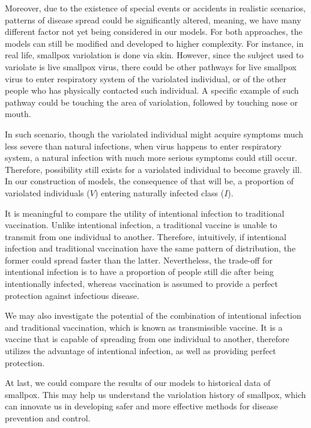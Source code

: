 \documentclass[12pt]{article}
\begin{document}
Moreover, due to the existence of special events or accidents in realistic scenarios, patterns of disease spread could be significantly altered, meaning, we have many different factor not yet being considered in our models. For both approaches, the models can still be modified and developed to higher complexity. For instance, in real life, smallpox variolation is done via skin. However, since the subject used to variolate is live smallpox virus, there could be other pathways for live smallpox virus to enter respiratory system of the variolated individual, or of the other people who has physically contacted such individual. A specific example of such pathway could be touching the area of variolation, followed by touching nose or mouth. 

In such scenario, though the variolated individual might acquire symptoms much less severe than natural infections, when virus happens to enter respiratory system, a natural infection with much more serious symptoms could still occur. Therefore, possibility still exists for a variolated individual to become gravely ill. In our construction of models, the consequence of that will be, a proportion of variolated individuals ($V$) entering naturally infected class ($I$).

It is meaningful to compare the utility of intentional infection to traditional vaccination. Unlike intentional infection, a traditional vaccine is unable to transmit from one individual to another. Therefore, intuitively, if intentional infection and traditional vaccination have the same pattern of distribution, the former could spread faster than the latter. Nevertheless, the trade-off for intentional infection is to have a proportion of people still die after being intentionally infected, whereas vaccination is assumed to provide a perfect protection against infectious disease.

We may also investigate the potential of the combination of intentional infection and traditional vaccination, which is known as transmissible vaccine. It is a vaccine that is capable of spreading from one individual to another, therefore utilizes the advantage of intentional infection, as well as providing perfect protection.

At last, we could compare the results of our models to historical data of smallpox. This may help us understand the variolation history of smallpox, which can innovate us in developing safer and more effective methods for disease prevention and control.

\printbibliography
\end{document}
